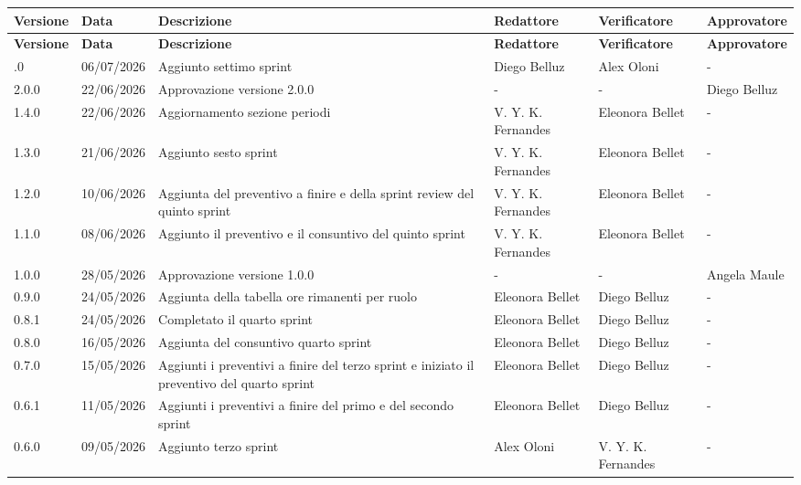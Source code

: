 \documentclass[a4paper,12pt]{article}
\begin{document}
\setlength{\tabcolsep}{3pt} 
\footnotesize
\begin{longtable}{|l|l|p{4.5cm}|p{2cm}|p{2.5cm}|p{2.5cm}|}
    \hline
    \rowcolor{gray!20}
    \textbf{Versione} & \textbf{Data} & \textbf{Descrizione} & \textbf{Redattore} & \textbf{Verificatore} & \textbf{Approvatore} \\
    \hline
    \endfirsthead 
    \hline
    \rowcolor{gray!20}
    \textbf{Versione} & \textbf{Data} & \textbf{Descrizione} & \textbf{Redattore} & \textbf{Verificatore} & \textbf{Approvatore} \\
    \hline
    \endhead 
    \endfoot
    \endlastfoot
    2.1.0 & 06/07/2026 & Aggiunto settimo sprint & Diego Belluz & Alex Oloni & - \\ \hline
    2.0.0 & 22/06/2026 & Approvazione versione 2.0.0 & - & - & Diego Belluz \\ \hline
    1.4.0 & 22/06/2026 & Aggiornamento sezione periodi & V. Y. K. Fernandes & Eleonora Bellet & - \\ \hline
    1.3.0 & 21/06/2026 & Aggiunto sesto sprint & V. Y. K. Fernandes & Eleonora Bellet & - \\ \hline
    1.2.0 & 10/06/2026 & Aggiunta del preventivo a finire e della sprint review del quinto sprint & V. Y. K. Fernandes & Eleonora Bellet & - \\ \hline
    1.1.0 & 08/06/2026 & Aggiunto il preventivo e il consuntivo del quinto sprint & V. Y. K. Fernandes & Eleonora Bellet & - \\ \hline
    1.0.0 & 28/05/2026 & Approvazione versione 1.0.0 & - & - & Angela Maule \\ \hline
    0.9.0 & 24/05/2026 & Aggiunta della tabella ore rimanenti per ruolo & Eleonora Bellet & Diego Belluz & - \\ \hline
    0.8.1 & 24/05/2026 & Completato il quarto sprint & Eleonora Bellet & Diego Belluz & - \\ \hline
    0.8.0 & 16/05/2026 & Aggiunta del consuntivo quarto sprint & Eleonora Bellet & Diego Belluz & - \\ \hline
    0.7.0 & 15/05/2026 & Aggiunti i preventivi a finire del terzo sprint e iniziato il preventivo del quarto sprint & Eleonora Bellet & Diego Belluz & - \\ \hline
    0.6.1 & 11/05/2026 & Aggiunti i preventivi a finire del primo e del secondo sprint & Eleonora Bellet & Diego Belluz & - \\ \hline
    0.6.0 & 09/05/2026 & Aggiunto terzo sprint & Alex Oloni & V. Y. K. Fernandes & - \\ \hline

\end{longtable}
\end{document}
